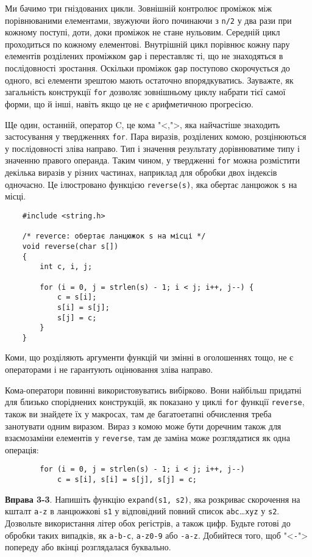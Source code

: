 \documentclass[a4paper,12pt]{book}
\begin{document}
  Ми бачимо три гніздованих цикли. Зовнішній контролює проміжок між порівнюваними
  елементами, звужуючи його починаючи з \texttt{n/2} у два рази при кожному поступі, доти,
  доки проміжок не стане нульовим. Середній цикл проходиться по кожному елементові.
  Внутрішній цикл порівнює кожну пару елементів розділених проміжком \texttt{gap} і
  переставляє ті, що не знаходяться в послідовності зростання. Оскільки проміжок
  \texttt{gap} поступово скорочується до одного, всі елементи зрештою мають остаточно
  впорядкуватись. Зауважте, як загальність конструкції \texttt{for} дозволяє зовнішньому
  циклу набрати тієї самої форми, що й інші, навіть якщо це не є арифметичною прогресією.

  Ще один, останній, оператор C, це кома "<,">, яка найчастіше знаходить
  застосування у твердженнях \texttt{for}. Пара виразів, розділених комою, розцінюються у
  послідовності зліва направо. Тип і значення результату дорівнюватиме типу і значенню
  правого операнда. Таким чином, у твердженні \texttt{for} можна розмістити декілька
  виразів у різних частинах, наприклад для обробки двох індексів одночасно. Це ілюстровано
  функцією \texttt{reverse(s)}, яка обертає ланцюжок \texttt{s} на місці.
  \begin{verbatim}
    #include <string.h>

    /* reverce: обертає ланцюжок s на місці */
    void reverse(char s[])
    {
        int c, i, j;

        for (i = 0, j = strlen(s) - 1; i < j; i++, j--) {
            c = s[i];
            s[i] = s[j];
            s[j] = c;
        }
    }
  \end{verbatim}

  Коми, що розділяють аргументи функцій чи змінні в оголошеннях тощо, не є
  операторами і не гарантують оцінювання зліва направо.

  Кома-оператори повинні використовуватись вибірково. Вони найбільш придатні для близько
  споріднених конструкцій, як показано у циклі \texttt{for} функції \texttt{reverse},
  також ви знайдете їх у макросах, там де багатоетапні обчислення треба занотувати одним
  виразом. Вираз з комою може бути доречним також для взаємозаміни елементів у
  \texttt{reverse}, там де заміна може розглядатися як одна операція:
  \begin{verbatim}
        for (i = 0, j = strlen(s) - 1; i < j; i++, j--)
            c = s[i], s[i] = s[j], s[j] = c;
  \end{verbatim}

  \textbf{Вправа 3-3}. Напишіть функцію \texttt{expand(s1, s2)}, яка розкриває скорочення
  на кшталт \texttt{a-z} в ланцюжкові \texttt{s1} у відповідний повний список
  \texttt{abc}\ldots\texttt{xyz} у \texttt{s2}. Дозвольте використання літер обох
  регістрів, а також цифр. Будьте готові до обробки таких випадків, як \texttt{a-b-c},
  \texttt{a-z0-9} або \texttt{-a-z}. Добийтеся того, щоб "<\texttt{-}"> попереду або
  вкінці розглядалася буквально.
\end{document}
